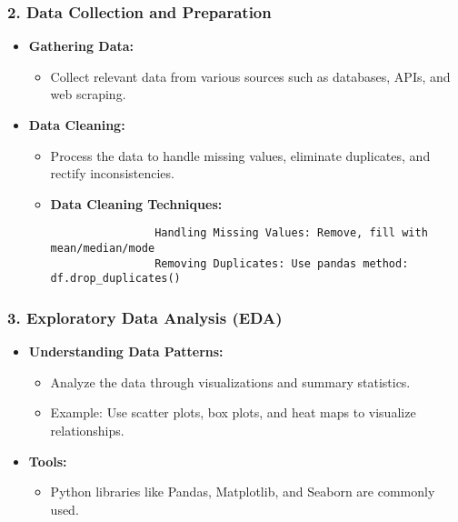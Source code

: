 \documentclass[aspectratio=169]{beamer}
\begin{document}
\begin{frame}[fragile]
    \frametitle{2. Data Collection and Preparation}
    
    \begin{itemize}
        \item \textbf{Gathering Data:}
            \begin{itemize}
                \item Collect relevant data from various sources such as databases, APIs, and web scraping.
            \end{itemize}
        \item \textbf{Data Cleaning:}
            \begin{itemize}
                \item Process the data to handle missing values, eliminate duplicates, and rectify inconsistencies.
                \item \textbf{Data Cleaning Techniques:}
                \begin{lstlisting}
                Handling Missing Values: Remove, fill with mean/median/mode
                Removing Duplicates: Use pandas method: df.drop_duplicates()
                \end{lstlisting}
            \end{itemize}
    \end{itemize}
\end{frame}

\begin{frame}[fragile]
    \frametitle{3. Exploratory Data Analysis (EDA)}
    
    \begin{itemize}
        \item \textbf{Understanding Data Patterns:}
            \begin{itemize}
                \item Analyze the data through visualizations and summary statistics.
                \item Example: Use scatter plots, box plots, and heat maps to visualize relationships.
            \end{itemize}
        \item \textbf{Tools:}
            \begin{itemize}
                \item Python libraries like Pandas, Matplotlib, and Seaborn are commonly used.
            \end{itemize}
    \end{itemize}
\end{frame}
\end{document}
